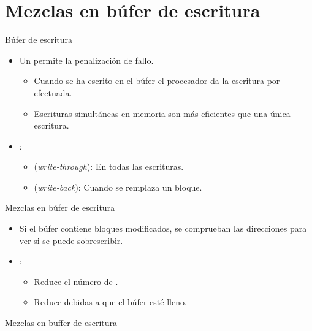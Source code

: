 \section{Mezclas en búfer de escritura}

\begin{frame}[t]{Búfer de escritura}
\begin{itemize}
  \item Un  permite  la penalización de fallo.
    \begin{itemize}
      \item Cuando se ha escrito en el búfer el procesador da la escritura por efectuada.
      \item Escrituras simultáneas en memoria son más eficientes que una única escritura.
    \end{itemize}

  \item {}:
    \begin{itemize}
      \item {} (\emph{write-through}): En todas las escrituras.
      \item {} (\emph{write-back}): Cuando se remplaza un bloque.
    \end{itemize}
\end{itemize}
\end{frame}

\begin{frame}[t]{Mezclas en búfer de escritura}
\begin{itemize}
  \item Si el búfer contiene bloques modificados, 
        se comprueban las direcciones para ver si se puede sobrescribir.

  \item {}:
    \begin{itemize}
      \item Reduce el número de .
      \item Reduce  debidas a que el búfer esté lleno.
    \end{itemize}
\end{itemize}
\end{frame}

\begin{frame}[t]{Mezclas en buffer de escritura}


\end{frame}
